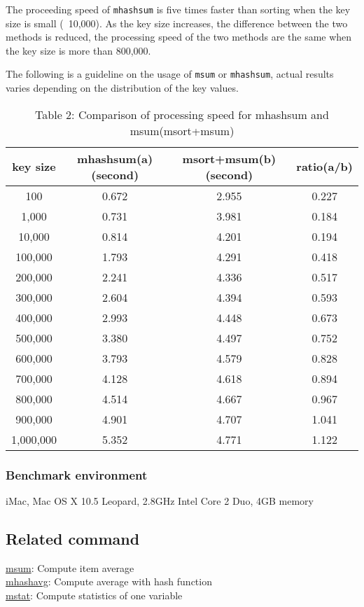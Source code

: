 \documentclass[a4paper]{jarticle}
\begin{document}
The proceeding speed of \verb|mhashsum| is five times faster than sorting when the key size is small (~10,000). 
As the key size increases, the difference between the two methods is reduced, the processing speed of the two methods are the same when the key size is more than 800,000.

The following is a guideline on the usage of \verb|msum| or \verb|mhashsum|, actual results varies depending on the distribution of the key values.

\begin{table}[h]
\begin{center}
 \caption{Table 2: Comparison of processing speed for mhashsum and msum(msort+msum)}
 \begin{tabular}{|c|c|c|c|}
  \hline
key size & mhashsum(a)(second)&msort+msum(b)(second)&ratio(a/b)\\ \hline \hline
100&0.672&2.955&0.227\\ \hline
1,000&0.731&3.981&0.184\\ \hline
10,000&0.814&4.201&0.194\\ \hline
100,000&1.793&4.291&0.418\\ \hline
200,000&2.241&4.336&0.517\\ \hline
300,000&2.604&4.394&0.593\\ \hline
400,000&2.993&4.448&0.673\\ \hline
500,000&3.380&4.497&0.752\\ \hline
600,000&3.793&4.579&0.828\\ \hline
700,000&4.128&4.618&0.894\\ \hline
800,000&4.514&4.667&0.967\\ \hline
900,000&4.901&4.707&1.041\\ \hline
1,000,000&5.352&4.771&1.122\\ \hline
 \end{tabular}
\end{center}
\end{table}

\subsubsection*{Benchmark environment}

iMac, Mac OS X 10.5 Leopard, 2.8GHz Intel Core 2 Duo, 4GB memory

\subsection*{Related command}
\noindent
\href{run:msum.pdf}{msum}: Compute item average \\
\href{run:mhashavg.pdf}{mhashavg}: Compute average with hash function \\
\href{run:mstat.pdf}{mstat}: Compute statistics of one variable \\
\end{document}
